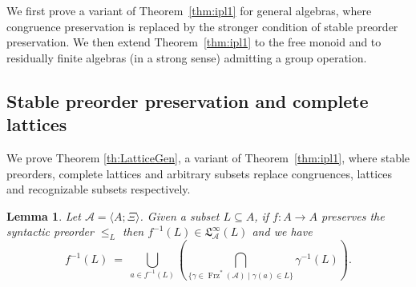 \documentclass[11pt,a4paper]{article}
\newtheorem{lemma}[theorem]{Lemma}
\theoremstyle{definition} %
\newcommand\+[1]{\mathcal{#1}} %
\newcommand{\Latt}{{\mathfrak{L}}}
\DeclareMathOperator{\freez}{Frz}%
\begin{document}
We first prove a variant of Theorem~\ref{thm:ipl1}  for general algebras, where  congruence preservation is replaced by the  stronger condition of 
stable preorder preservation.
We then  extend  Theorem~\ref{thm:ipl1}   to the free monoid
and  to residually finite algebras (in a strong sense) admitting a group operation.  

\subsection{Stable preorder preservation and complete lattices}\label{ss:spp}
We prove Theorem \ref{th:LatticeGen}, a variant of Theorem~\ref{thm:ipl1}, where
stable preorders, complete lattices and arbitrary subsets replace congruences, lattices
and recognizable subsets respectively.

\begin{lemma} \label{f^-1-dansTreillis} Let $\+A=\langle A;\Xi\rangle$.  
Given a subset $L\subseteq A$, if $f : A\to A$ preserves the syntactic preorder $\leq_L$
then $f^{-1}(L) \in \Latt_{\+A}^\infty(L)$ and we have
\begin{equation}\label{eq:f-1L}
f^{-1}(L) \ =\ \mathop{\bigcup}\limits_{a\in f^{-1}(L)}\left(\mathop{\bigcap}\limits_{\{\gamma\in  {\freez^*}(\+A)\mid \gamma(a)\in L\}}\gamma^{-1}(L)\right).
\end{equation}
\end{lemma}
\end{document}
